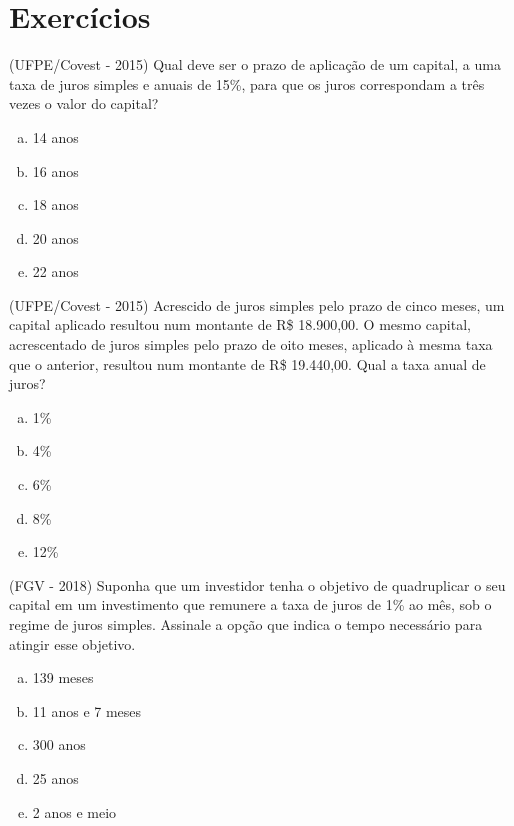 
\section{Exercícios}
 
 \begin{exer}
 
  (UFPE/Covest - 2015) Qual deve ser o prazo de aplicação de um capital, a uma taxa de juros simples e anuais de 15\%, para que os juros correspondam a três vezes o valor do capital?
  \begin{enumerate}[a)]
  \item 14 anos
  \item 16 anos
  \item 18 anos
  \item 20 anos
  \item 22 anos
  \end{enumerate}
  \end{exer}
  
  \begin{exer}
  (UFPE/Covest - 2015) Acrescido de juros simples pelo prazo de cinco meses, um capital aplicado resultou num montante de R\$ 18.900,00. O mesmo capital, acrescentado de juros simples pelo prazo de oito meses, aplicado à mesma taxa que o anterior, resultou num montante de R\$ 19.440,00. Qual a taxa anual de juros?
  \begin{enumerate}[a)]
  \item 1\%
  \item 4\%
  \item 6\%
  \item 8\%
  \item 12\%
  \end{enumerate}
  \end{exer}

  \begin{exer}
  (FGV - 2018) Suponha que um investidor tenha o objetivo de quadruplicar o seu capital em um investimento que remunere a taxa de juros de 1\% ao mês, sob o regime de juros simples. Assinale a opção que indica o tempo necessário para atingir esse objetivo.
  \begin{enumerate}[a)]
  \item 139 meses
  \item 11 anos e 7 meses
  \item 300 anos
  \item 25 anos
  \item 2 anos e meio
  \end{enumerate}
  \end{exer}

